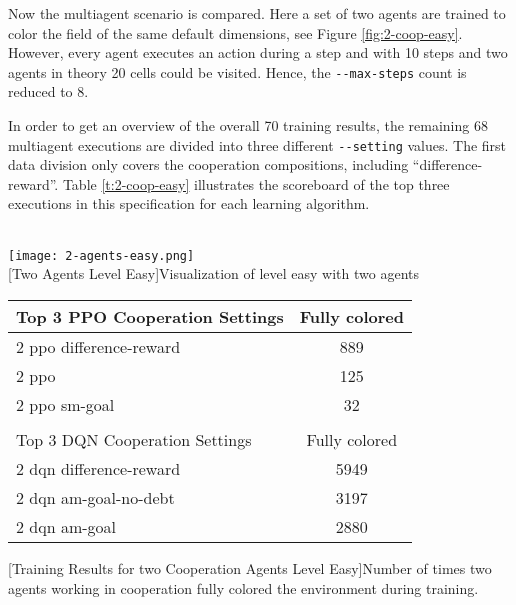Now the multiagent scenario is compared. Here a set of two agents are trained to color the field of the same default dimensions, see Figure \ref{fig:2-coop-easy}. However, every agent executes an action during a step and with 10 steps and two agents in theory 20 cells could be visited. Hence, the \verb|--max-steps| count is reduced to 8. 

In order to get an overview of the overall 70 training results, the remaining 68 multiagent executions are divided into three different \verb|--setting| values. The first data division only covers the cooperation compositions, including ``difference-reward''. Table \ref{t:2-coop-easy} illustrates the scoreboard of the top three executions in this specification for each learning algorithm. \\\\

\begin{minipage}{\textwidth}
  \begin{minipage}[b]{0.29\textwidth}
    \centering
    \texttt{[image: 2-agents-easy.png]}\\
    [Two Agents Level Easy]{Visualization of level easy with two agents}\label{fig:2-coop-easy}
  \end{minipage}
  \hfill
    \begin{minipage}[b]{0.69\textwidth}
    \centering
    \begin{tabular}{lc}\hline
        Top 3 PPO Cooperation Settings & Fully colored \\ \hline
        2 ppo difference-reward & 889 \\
        2 ppo & 125 \\
        2 ppo sm-goal & 32 \\ \hline
         &   \\ \hline
        Top 3 DQN Cooperation Settings & Fully colored \\ \hline
        2 dqn difference-reward & 5949 \\
        2 dqn am-goal-no-debt & 3197 \\
        2 dqn am-goal & 2880 \\ \hline
        \end{tabular}
        [Training Results for two Cooperation Agents Level Easy]{Number of times two agents working in cooperation fully colored the environment during training.}\label{t:2-coop-easy}
    \end{minipage}
  \end{minipage}\\\\

